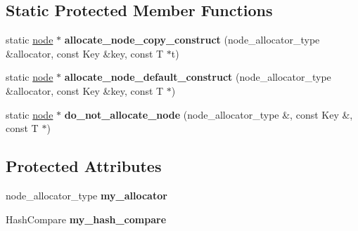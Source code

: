 \subsection*{Static Protected Member Functions}
\begin{DoxyCompactItemize}
\item 
\hypertarget{classtbb_1_1interface5_1_1concurrent__hash__map_a5d0511bb9f53f6269308e761b8e21280}{}static \hyperlink{structtbb_1_1interface5_1_1concurrent__hash__map_1_1node}{node} $\ast$ {\bfseries allocate\+\_\+node\+\_\+copy\+\_\+construct} (node\+\_\+allocator\+\_\+type \&allocator, const Key \&key, const T $\ast$t)\label{classtbb_1_1interface5_1_1concurrent__hash__map_a5d0511bb9f53f6269308e761b8e21280}

\item 
\hypertarget{classtbb_1_1interface5_1_1concurrent__hash__map_a9f67fd62790d6c336829967e57dcbf49}{}static \hyperlink{structtbb_1_1interface5_1_1concurrent__hash__map_1_1node}{node} $\ast$ {\bfseries allocate\+\_\+node\+\_\+default\+\_\+construct} (node\+\_\+allocator\+\_\+type \&allocator, const Key \&key, const T $\ast$)\label{classtbb_1_1interface5_1_1concurrent__hash__map_a9f67fd62790d6c336829967e57dcbf49}

\item 
\hypertarget{classtbb_1_1interface5_1_1concurrent__hash__map_ae6f3bf945cc7e9c0f308b5773c6ef187}{}static \hyperlink{structtbb_1_1interface5_1_1concurrent__hash__map_1_1node}{node} $\ast$ {\bfseries do\+\_\+not\+\_\+allocate\+\_\+node} (node\+\_\+allocator\+\_\+type \&, const Key \&, const T $\ast$)\label{classtbb_1_1interface5_1_1concurrent__hash__map_ae6f3bf945cc7e9c0f308b5773c6ef187}

\end{DoxyCompactItemize}
\subsection*{Protected Attributes}
\begin{DoxyCompactItemize}
\item 
\hypertarget{classtbb_1_1interface5_1_1concurrent__hash__map_a19465c779184824a26fef997c1c93704}{}node\+\_\+allocator\+\_\+type {\bfseries my\+\_\+allocator}\label{classtbb_1_1interface5_1_1concurrent__hash__map_a19465c779184824a26fef997c1c93704}

\item 
\hypertarget{classtbb_1_1interface5_1_1concurrent__hash__map_a527efdaab0be6cf6826f0b73b379cebb}{}Hash\+Compare {\bfseries my\+\_\+hash\+\_\+compare}\label{classtbb_1_1interface5_1_1concurrent__hash__map_a527efdaab0be6cf6826f0b73b379cebb}

\end{DoxyCompactItemize}
